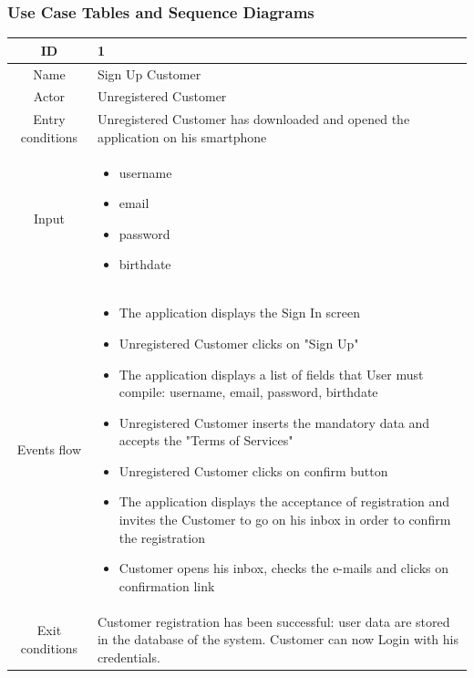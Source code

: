 \subsubsection{Use Case Tables and Sequence Diagrams}
\begin{longtable}{ | c | p{10cm} | }

    \hline
    ID               & 1                        \\ \hline
    Name             & Sign Up Customer   \\
    \hline
    Actor            & Unregistered Customer \\
    \hline
    Entry conditions & Unregistered Customer has downloaded and opened the application on his smartphone
    \\
    \hline

    Input            & \begin{itemize}
        \item username
        \item email
        \item password
        \item birthdate
    \end{itemize} \\ \hline
    Events flow      & \begin{itemize}[nosep,after=\strut]
        \item The application displays the Sign In screen
        \item Unregistered Customer clicks on "Sign Up"
        \item The application displays a list of fields that User must compile: username, email, password, birthdate
        \item Unregistered Customer inserts the mandatory data and accepts the "Terms of Services"
        \item Unregistered Customer clicks on confirm button
        \item The application displays the acceptance of registration and invites the Customer to go on his inbox in order to confirm the registration
        \item Customer opens his inbox, checks the e-mails and clicks on confirmation link
    \end{itemize} \\
    \hline
    Exit conditions  & Customer registration has been successful: user data are stored in the database of the system. Customer can now Login with his credentials. \\ \hline

\end{longtable}
